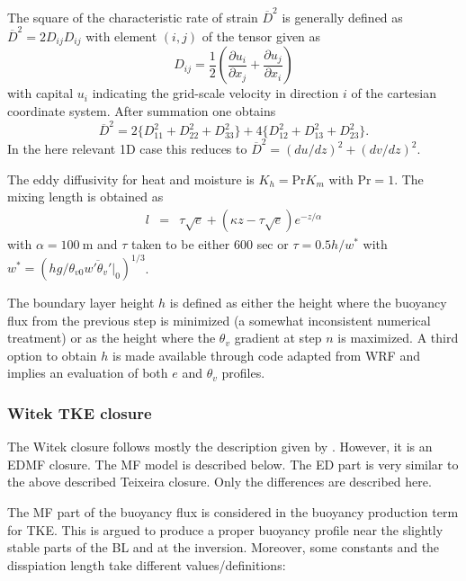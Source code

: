 \documentclass[dvipdfmx,a4paper,10pt]{article}
\begin{document}
The square of the characteristic rate of strain $\overline{D}^2$ is generally defined as $\overline{D}^2=2D_{ij}D_{ij}$ with element $(i,j)$ of the tensor given as
\begin{equation}
 D_{ij}=\frac{1}{2}(\frac{\partial u_i}{\partial x_j}+\frac{\partial u_j}{\partial x_i})
\end{equation}
with capital $u_i$ indicating the grid-scale velocity in direction $i$ of the cartesian coordinate system. After summation one obtains 
\begin{equation}\label{eqn:def2}
 \overline{D}^2=2\{D_{11}^2+D_{22}^2+D_{33}^2\}+4\{D_{12}^2+D_{13}^2+D_{23}^2 \}.
\end{equation}
In the here relevant 1D case this reduces to $\overline{D}^2=(du/dz)^2+(dv/dz)^2$.

The eddy diffusivity for heat and moisture is $K_h=\mathrm{Pr} K_m$ with $\mathrm{Pr}=1$. The mixing length is obtained as
\begin{eqnarray}
 l &=& \tau \sqrt{e} + (\kappa z - \tau \sqrt{e}) e^{-z/\alpha}
\end{eqnarray}
with $\alpha=100\mathrm{~m}$ and $\tau$ taken to be either 600 sec or $\tau=0.5 h/w^*$ with $w^*=(hg/\theta_{v0} \overline{w'\theta_v'}|_0)^{1/3}$. 

The boundary layer height $h$ is defined as either the height where the buoyancy flux from the previous step is minimized (a somewhat inconsistent numerical treatment) or as the height where the $\theta_v$ gradient at step $n$ is maximized. A third option to obtain $h$ is made available through code adapted from WRF and implies an evaluation of both $e$ and $\theta_v$ profiles. 


\subsubsection{Witek TKE closure}

The Witek closure follows mostly the description given by \cite{witek11}. However, it is an EDMF closure. The MF model is described below. The ED part is very similar to the above described Teixeira closure. Only the differences are described here.

The MF part of the buoyancy flux is considered in the buoyancy production term for TKE. This is argued to produce a proper buoyancy profile near the slightly stable parts of the BL and at the inversion. 
Moreover, some constants and the disspiation length take different values/definitions:
\end{document}
